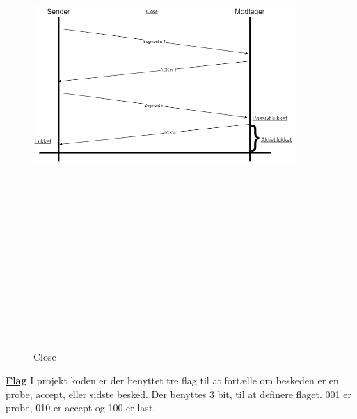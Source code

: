 \begin{figure}[ht]
	\centering
	\includegraphics[width=10cm,height=20cm,keepaspectratio]{pictures/Close.png}
	\caption{Close}
	\label{fig:close}
\end{figure}

\hfill \break
\hfill \break
\hfill \break
\hfill \break
\underline{\textbf{Flag}}
\newline
I projekt koden er der benyttet tre flag til at fortælle om beskeden er en probe, accept, eller sidste besked.
Der benyttes 3 bit, til at definere flaget. 001 er probe, 010 er accept og 100 er last.